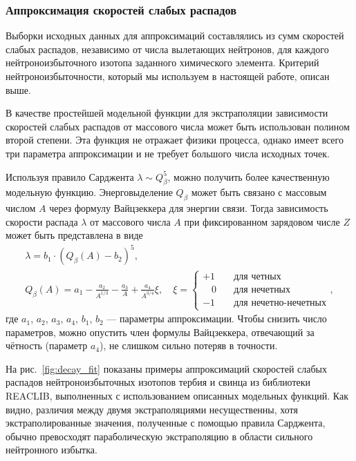 \subsubsection{Аппроксимация скоростей слабых распадов}
  Выборки исходных данных для аппроксимаций составлялись из сумм скоростей слабых распадов, независимо от числа вылетающих нейтронов, для каждого нейтроноизбыточного изотопа заданного химического элемента. Критерий нейтроноизбыточности, который мы используем в настоящей работе, описан выше.
  
  В качестве простейшей модельной функции для экстраполяции зависимости скоростей слабых распадов от массового числа может быть использован полином второй степени. Эта функция не отражает физики процесса, однако имеет всего три параметра аппроксимации и не требует большого числа исходных точек. 

  Используя правило Сарджента $\lambda \sim Q_\beta^5$, можно получить более качественную модельную функцию. Энерговыделение $Q_\beta$ может быть связано с массовым числом $A$ через формулу Вайцзеккера для энергии связи. Тогда зависимость скорости распада $\lambda$ от массового числа $A$ при фиксированном зарядовом числе $Z$ может быть представлена в виде
\begin{equation}
\begin{gathered}
  \displaystyle
  \lambda = b_1 \cdot (Q_\beta(A) - b_2)^5,\\
  Q_\beta(A) = 
  a_1 - \frac{a_2}{A^{1/3}} - \frac{a_3}{A} + \frac{a_4}{A^{3/4}} \xi,
  \quad \xi =
  \begin{cases}
    +1& \quad\text{для четных} \\
    \hspace{11pt}0& \quad\text{для нечетных} \\
    -1& \quad\text{для нечетно-нечетных}
  \end{cases},
\end{gathered}
\end{equation}
где $a_1$, $a_2$, $a_3$, $a_4$, $b_1$, $b_2$ --- параметры аппроксимации. Чтобы снизить число параметров, можно опустить член формулы Вайцзеккера, отвечающий за чётность (параметр $a_4$), не слишком сильно потеряв в точности.

  На рис.~\ref{fig:decay_fit} показаны примеры аппроксимаций скоростей слабых распадов нейтроноизбыточных изотопов тербия и свинца из библиотеки REACLIB, выполненных с использованием описанных модельных функций. Как видно, различия между двумя экстраполяциями несущественны, хотя экстраполированные значения, полученные с помощью правила Сарджента, обычно превосходят параболическую экстраполяцию в области сильного нейтронного избытка.
  
